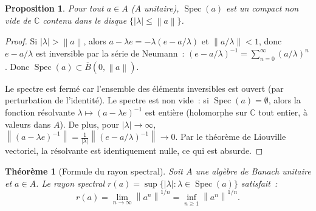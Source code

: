 \documentclass[a4paper,12pt]{book}
\DeclareMathOperator{\Spec}{Spec}
\newcommand{\C}{\mathbb{C}}
\newcommand{\norm}[1]{\left\| #1 \right\|}
\newcommand{\abs}[1]{\left| #1 \right|}
\theoremstyle{definition}
\theoremstyle{plain}
\newtheorem{theoreme}[definition]{Théorème}
\newtheorem{proposition}[definition]{Proposition}
\theoremstyle{remark}
\begin{document}
\begin{proposition}
\label{prop:spectre-compact}
Pour tout $a \in A$ ($A$ unitaire), $\Spec(a)$ est un compact non vide de $\C$ contenu
dans le disque $\{\abs{\lambda} \le \norm{a}\}$.
\end{proposition}

\begin{proof}
Si $\abs{\lambda} > \norm{a}$, alors $a - \lambda e = -\lambda(e - a/\lambda)$ et
$\norm{a/\lambda} < 1$, donc $e - a/\lambda$ est inversible par la série de Neumann~:
$(e - a/\lambda)^{-1} = \sum_{n=0}^\infty (a/\lambda)^n$. Donc
$\Spec(a) \subset \overline{B}(0, \norm{a})$.

Le spectre est fermé car l'ensemble des éléments inversibles est ouvert (par perturbation
de l'identité). Le spectre est non vide~: si $\Spec(a) = \emptyset$, alors la fonction
résolvante $\lambda \mapsto (a - \lambda e)^{-1}$ est entière (holomorphe sur $\C$
tout entier, à valeurs dans $A$). De plus, pour $\abs{\lambda} \to \infty$,
$\norm{(a - \lambda e)^{-1}} = \frac{1}{\abs{\lambda}}\norm{(e - a/\lambda)^{-1}} \to 0$.
Par le théorème de Liouville vectoriel, la résolvante est
identiquement nulle, ce qui est absurde.
\end{proof}

\begin{theoreme}[Formule du rayon spectral]
\label{thm:rayon-spectral}
Soit $A$ une algèbre de Banach unitaire et $a \in A$. Le \emph{rayon spectral}
$r(a) = \sup\{\abs{\lambda} : \lambda \in \Spec(a)\}$ satisfait~:
\[
  r(a) = \lim_{n \to \infty} \norm{a^n}^{1/n} = \inf_{n \ge 1} \norm{a^n}^{1/n}.
\]
\end{theoreme}
\end{document}
